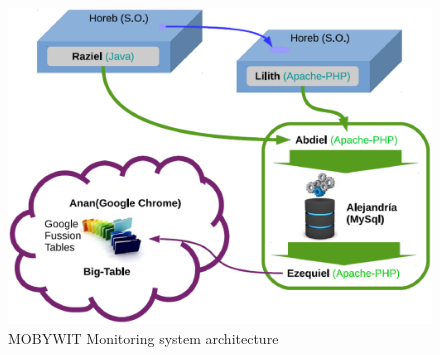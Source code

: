 \documentclass[preprint]{elsarticle}
\begin{document}
\begin{figure}[ht]
	\begin{center}
		\includegraphics[scale=0.4]{imgs/mobywit.eps}
		\caption{MOBYWIT Monitoring system architecture}
	\label{fig:mobywit}
	\end{center}
\end{figure}
\end{document}
